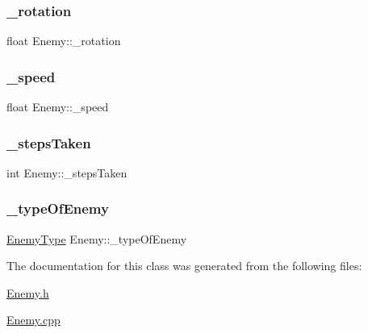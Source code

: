 \mbox{\label{class_enemy_ad00fabd2ca45f308cf3b0ead95c9bb82}} 
\subsubsection{\texorpdfstring{\+\_\+rotation}{\_rotation}}
{\footnotesize\ttfamily float Enemy\+::\+\_\+rotation\hspace{0.3cm}{\ttfamily [private]}}

\mbox{\label{class_enemy_a5ad8a827b28dd24331a434d1993d5c01}} 
\subsubsection{\texorpdfstring{\+\_\+speed}{\_speed}}
{\footnotesize\ttfamily float Enemy\+::\+\_\+speed\hspace{0.3cm}{\ttfamily [private]}}

\mbox{\label{class_enemy_a6c795cbaf685c2b4824601219c39192b}} 
\subsubsection{\texorpdfstring{\+\_\+steps\+Taken}{\_stepsTaken}}
{\footnotesize\ttfamily int Enemy\+::\+\_\+steps\+Taken\hspace{0.3cm}{\ttfamily [private]}}

\mbox{\label{class_enemy_a28e9fad6f896986b88f53895f6bba866}} 
\subsubsection{\texorpdfstring{\+\_\+type\+Of\+Enemy}{\_typeOfEnemy}}
{\footnotesize\ttfamily \hyperlink{_enemy_8h_ac3e413a86119db4b031458c7259e268e}{Enemy\+Type} Enemy\+::\+\_\+type\+Of\+Enemy\hspace{0.3cm}{\ttfamily [private]}}



The documentation for this class was generated from the following files\+:\begin{DoxyCompactItemize}
\item 
\hyperlink{_enemy_8h}{Enemy.\+h}\item 
\hyperlink{_enemy_8cpp}{Enemy.\+cpp}\end{DoxyCompactItemize}
